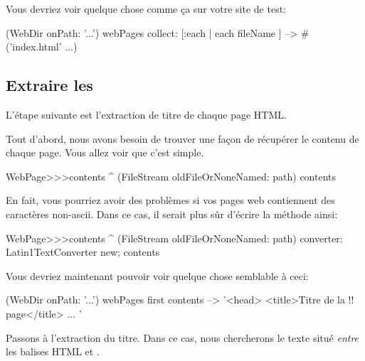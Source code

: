 \documentclass[a4paper,10pt,twoside]{book}
\begin{document}
\noindent{} Vous devriez voir quelque chose comme ça sur votre site de test: 

\begin{code}{}
(WebDir onPath: '...') webPages collect: [:each | each fileName ]
  --> #('index.html' ...)
\end{code}

\subsection{Extraire les \regexmatches}

L'étape suivante est l'extraction de titre de chaque page HTML.

Tout d'abord, nous avons besoin de trouver une façon de récupérer le
contenu de chaque page. Vous allez voir que c'est simple.


\begin{code}{}
WebPage>>>contents
	^ (FileStream oldFileOrNoneNamed: path) contents
\end{code}

En fait, vous pourriez avoir des problèmes si vos pages web
contiennent des caractères non-ascii. Dans ce cas, il serait plus sûr
d'écrire la méthode ainsi:

\begin{code}{}
WebPage>>>contents
	^ (FileStream oldFileOrNoneNamed: path)
		converter: Latin1TextConverter new;
		contents
\end{code}

\noindent{} Vous devriez maintenant pouvoir voir quelque chose semblable à ceci:

\begin{code}{}
(WebDir onPath: '...') webPages first contents --> '<head>
<title>Titre de la !! page</title>
...
'
\end{code}

Passons à l'extraction du titre. Dans ce cas, nous chercherons le
texte situé \emph{entre} les balises HTML  et . 
\end{document}
